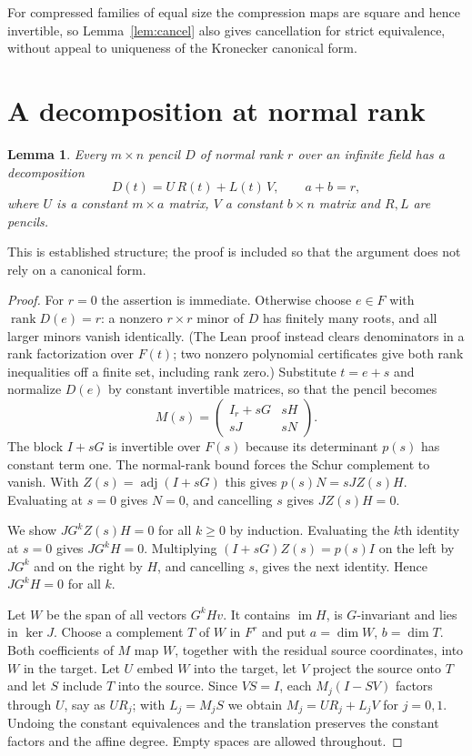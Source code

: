 \documentclass[11pt]{article}
\newtheorem{lemma}{Lemma}
\newcommand{\rk}{\operatorname{rank}}
\newcommand{\im}{\operatorname{im}}
\newcommand{\Ft}{F(t)}
\begin{document}
For compressed families of equal size the compression maps are square and hence invertible, so Lemma~\ref{lem:cancel} also gives cancellation for strict equivalence, without appeal to uniqueness of the Kronecker canonical form.

\section{A decomposition at normal rank}\label{sec:decomposition}

\begin{lemma}\label{lem:decomp}
Every $m\times n$ pencil $D$ of normal rank $r$ over an infinite field has a decomposition
\begin{equation}\label{eq:decomp}
D(t)=U\,R(t)+L(t)\,V,\qquad a+b=r,
\end{equation}
where $U$ is a constant $m\times a$ matrix, $V$ a constant $b\times n$ matrix and $R,L$ are pencils.
\end{lemma}

This is established structure; the proof is included so that the argument does not rely on a canonical form.

\begin{proof}
For $r=0$ the assertion is immediate. Otherwise choose $e\in F$ with $\rk D(e)=r$: a nonzero $r\times r$ minor of $D$ has finitely many roots, and all larger minors vanish identically. (The Lean proof instead clears denominators in a rank factorization over $\Ft$; two nonzero polynomial certificates give both rank inequalities off a finite set, including rank zero.) Substitute $t=e+s$ and normalize $D(e)$ by constant invertible matrices, so that the pencil becomes
\[
M(s)=\begin{pmatrix}I_r+sG&sH\\ sJ&sN\end{pmatrix}.
\]
The block $I+sG$ is invertible over $F(s)$ because its determinant $p(s)$ has constant term one. The normal-rank bound forces the Schur complement to vanish. With $Z(s)=\operatorname{adj}(I+sG)$ this gives $p(s)N=sJZ(s)H$. Evaluating at $s=0$ gives $N=0$, and cancelling $s$ gives $JZ(s)H=0$.

We show $JG^kZ(s)H=0$ for all $k\ge0$ by induction. Evaluating the $k$th identity at $s=0$ gives $JG^kH=0$. Multiplying $(I+sG)Z(s)=p(s)I$ on the left by $JG^k$ and on the right by $H$, and cancelling $s$, gives the next identity. Hence $JG^kH=0$ for all $k$.

Let $W$ be the span of all vectors $G^kHv$. It contains $\im H$, is $G$-invariant and lies in $\ker J$. Choose a complement $T$ of $W$ in $F^r$ and put $a=\dim W$, $b=\dim T$. Both coefficients of $M$ map $W$, together with the residual source coordinates, into $W$ in the target. Let $U$ embed $W$ into the target, let $V$ project the source onto $T$ and let $S$ include $T$ into the source. Since $VS=I$, each $M_j(I-SV)$ factors through $U$, say as $UR_j$; with $L_j=M_jS$ we obtain $M_j=UR_j+L_jV$ for $j=0,1$. Undoing the constant equivalences and the translation preserves the constant factors and the affine degree. Empty spaces are allowed throughout.
\end{proof}
\end{document}
